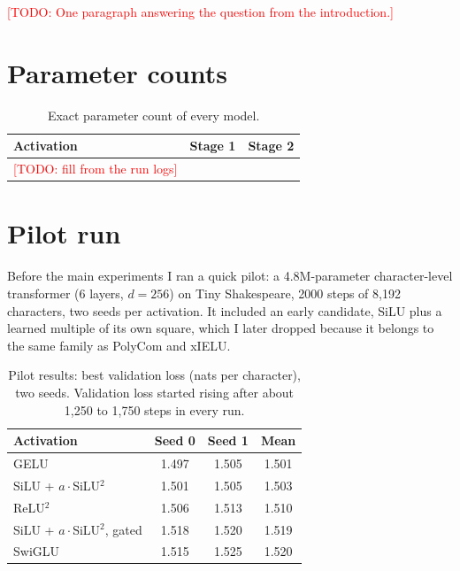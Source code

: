 \documentclass{article}
\newcommand{\todo}[1]{\textcolor{red}{[TODO: #1]}}
\begin{document}
\todo{One paragraph answering the question from the introduction.}




\appendix

\section{Parameter counts}
\label{app:hparams}

\begin{table}[h]
  \caption{Exact parameter count of every model.}
  \label{tab:params}
  \centering
  \begin{tabular}{lcc}
    \toprule
    Activation & Stage 1 & Stage 2 \\
    \midrule
    \todo{fill from the run logs} & & \\
    \bottomrule
  \end{tabular}
\end{table}

\section{Pilot run}
\label{app:pilot}

Before the main experiments I ran a quick pilot: a 4.8M-parameter character-level transformer (6 layers, $d = 256$) on Tiny Shakespeare, 2000 steps of 8,192 characters, two seeds per activation.
It included an early candidate, SiLU plus a learned multiple of its own square, which I later dropped because it belongs to the same family as PolyCom and xIELU.

\begin{table}[h]
  \caption{Pilot results: best validation loss (nats per character), two seeds. Validation loss started rising after about 1,250 to 1,750 steps in every run.}
  \label{tab:pilot}
  \centering
  \begin{tabular}{lccc}
    \toprule
    Activation & Seed 0 & Seed 1 & Mean \\
    \midrule
    GELU & 1.497 & 1.505 & 1.501 \\
    SiLU + $a \cdot$SiLU$^2$ & 1.501 & 1.505 & 1.503 \\
    ReLU$^2$ & 1.506 & 1.513 & 1.510 \\
    SiLU + $a \cdot$SiLU$^2$, gated & 1.518 & 1.520 & 1.519 \\
    SwiGLU & 1.515 & 1.525 & 1.520 \\
    \bottomrule
  \end{tabular}
\end{table}
\end{document}
